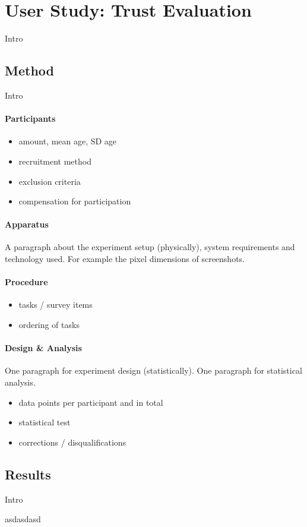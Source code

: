 \section{User Study: Trust Evaluation}
Intro


\subsection{Method}
Intro

\paragraph{Participants}
\begin{itemize}
	\item amount, mean age, SD age
	\item recruitment method
	\item exclusion criteria 
	\item compensation for participation
\end{itemize}

\paragraph{Apparatus}
A paragraph about the experiment setup (physically), system requirements and technology used. For example the pixel dimensions of screenshots. \newline

\paragraph{Procedure}
\begin{itemize}
	\item tasks / survey items
	\item ordering of tasks
\end{itemize}

\paragraph{Design \& Analysis}
One paragraph for experiment design (statistically).\medskip\newline
One paragraph for statistical analysis.\newline
\begin{itemize}
	\item data points per participant and in total
	\item statistical test
	\item corrections / disqualifications
\end{itemize}


\subsection{Results}
Intro \newline

asdasdasd